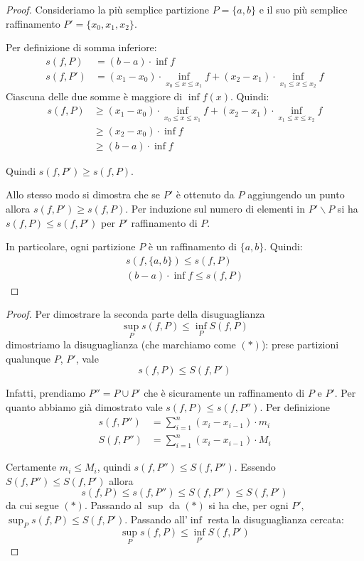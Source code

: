 \begin{proof}
Consideriamo la più semplice partizione $P=\{a,b\}$ e il suo più semplice raffinamento $P'=\{x_0, x_1, x_2\}$.

Per definizione di somma inferiore:
\begin{align*}
s(f,P) &= (b-a) \cdot \inf f \\
s(f,P') &= (x_1-x_0) \cdot \inf_{x_0 \le x \le x_1} f + (x_2-x_1) \cdot \inf_{x_1 \le x \le x_2} f
\end{align*}
Ciascuna delle due somme è maggiore di $\inf f(x)$. Quindi:
\begin{align*}
s(f,P) &\ge (x_1-x_0) \cdot \inf_{x_0 \le x \le x_1} f + (x_2-x_1) \cdot \inf_{x_1 \le x \le x_2} f \\
&\ge (x_2 - x_0) \cdot \inf f \\
&\ge (b-a) \cdot \inf f
\end{align*}

Quindi $s(f,P') \ge s(f,P)$. 

Allo stesso modo si dimostra che se $P'$ è ottenuto da $P$ aggiungendo un punto allora $s(f,P') \ge s(f,P)$. Per induzione sul numero di elementi in $P'\backslash P$ si ha $s(f,P) \le s(f,P')$ per $P'$ raffinamento di $P$.

In particolare, ogni partizione $P$ è un raffinamento di $\{a,b\}$. Quindi:
\begin{align*}
s(f,\{a,b\}) \le s(f,P) \\
(b-a) \cdot \inf f \le s(f,P)
\end{align*}
\end{proof}

\begin{proof}
Per dimostrare la seconda parte della disuguaglianza
\begin{equation*}
\sup_P s(f,P) \le \inf_P S(f,P)
\end{equation*}
dimostriamo la disuguaglianza (che marchiamo come $(*)$): prese partizioni qualunque $P$, $P'$, vale
\begin{equation*}
s(f,P) \le S(f,P')
\end{equation*}

Infatti, prendiamo $P'' = P \cup P'$ che è sicuramente un raffinamento di $P$ e $P'$. Per quanto abbiamo già dimostrato vale $s(f,P) \le s(f,P'')$. Per definizione
\begin{align*}
s(f, P'') &= \sum_{i=1}^n (x_i-x_{i-1}) \cdot m_i \\
S(f, P'') &= \sum_{i=1}^n (x_i-x_{i-1}) \cdot M_i
\end{align*}

Certamente $m_i \le M_i$, quindi $s(f,P'') \le S(f,P'')$. Essendo $S(f,P'') \le S(f, P')$ allora
\begin{equation*}
s(f,P) \le s(f,P'') \le S(f,P'') \le S(f,P')
\end{equation*}
da cui segue $(*)$. Passando al $\sup$ da $(*)$ si ha che, per ogni $P'$, $\sup_P s(f,P) \le S(f,P')$. Passando all'$\inf$ resta la disuguaglianza cercata:
\begin{equation*}
\sup_P s(f,P) \le \inf_{P'} S(f,P')
\end{equation*}
\end{proof}

